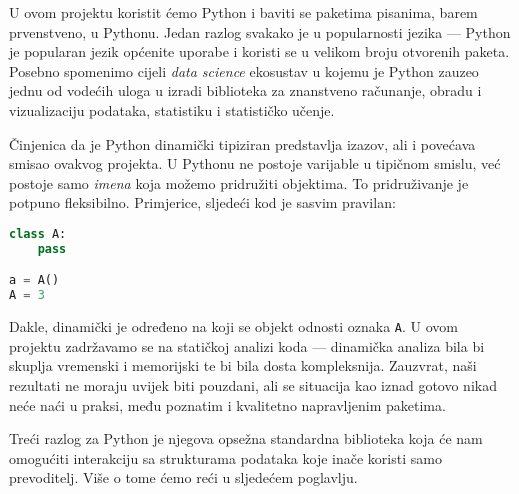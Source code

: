 U ovom projektu koristit ćemo Python i baviti se paketima pisanima, barem prvenstveno, u Pythonu. Jedan razlog svakako je u popularnosti jezika ---
Python je popularan jezik općenite uporabe i koristi se u
velikom broju otvorenih paketa. Posebno spomenimo cijeli \emph{data science} ekosustav u kojemu je Python zauzeo jednu od vodećih uloga u izradi biblioteka za znanstveno računanje, obradu i vizualizaciju podataka, statistiku i statističko učenje.


Činjenica da je Python dinamički tipiziran predstavlja izazov, ali i povećava smisao ovakvog projekta. U Pythonu ne postoje varijable u tipičnom smislu, već postoje samo \emph{imena} koja možemo pridružiti objektima. To pridruživanje je potpuno fleksibilno. Primjerice, sljedeći kod je sasvim pravilan:
\begin{lstlisting}[language=Python]
class A:
	pass

a = A()
A = 3
\end{lstlisting}

Dakle, dinamički je određeno na koji se objekt odnosti oznaka \texttt{A}.
U ovom projektu zadržavamo se na statičkoj analizi koda --- dinamička analiza bila bi skuplja vremenski i memorijski te bi bila dosta kompleksnija. Zauzvrat, naši rezultati ne moraju uvijek biti pouzdani, ali
se situacija kao iznad gotovo nikad neće naći u praksi, među
poznatim i kvalitetno napravljenim paketima.

Treći razlog za Python je njegova opsežna standardna biblioteka koja će nam omogućiti interakciju sa strukturama podataka koje inače koristi samo prevoditelj. Više o tome ćemo reći u sljedećem poglavlju.

